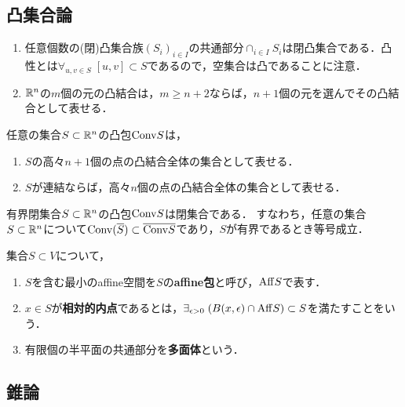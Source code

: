 \documentclass[uplatex,dvipdfmx]{jsreport}
\begin{document}
\subsection{凸集合論}



\begin{lemma}\mbox{}
    \begin{enumerate}
        \item 任意個数の(閉)凸集合族$(S_i)_{i\in I}$の共通部分$\cap_{i\in I}S_i$は閉凸集合である．凸性とは$\forall_{u,v\in S}\;[u,v]\subset S$であるので，空集合は凸であることに注意．
        \item $\mathbb{R}^n$の$m$個の元の凸結合は，$m\ge n+2$ならば，$n+1$個の元を選んでその凸結合として表せる．
    \end{enumerate}
\end{lemma}

\begin{theorem}[Caratheodory]
    任意の集合$S\subset\mathbb{R}^n$の凸包$\mathrm{Conv} S$は，
    \begin{enumerate}
        \item $S$の高々$n+1$個の点の凸結合全体の集合として表せる．
        \item $S$が連結ならば，高々$n$個の点の凸結合全体の集合として表せる．
    \end{enumerate}
\end{theorem}

\begin{theorem}
    有界閉集合$S\subset\mathbb{R}^n$の凸包$\mathrm{Conv} S$は閉集合である．
    すなわち，任意の集合$S\subset\mathbb{R}^n$について$\mathrm{Conv}(\overline{S})\subset\overline{\mathrm{Conv} S}$であり，$S$が有界であるとき等号成立．
\end{theorem}

\begin{definition}
    集合$S\subset V$について，
    \begin{enumerate}
        \item $S$を含む最小のaffine空間を$S$の\textbf{affine包}と呼び，$\mathrm{Aff} S$で表す．
        \item $x\in S$が\textbf{相対的内点}であるとは，$\exists_{\epsilon>0}\;(B(x,\epsilon)\cap\mathrm{Aff} S)\subset S$を満たすことをいう．
        \item 有限個の半平面の共通部分を\textbf{多面体}という．
    \end{enumerate}
\end{definition}

\subsection{錐論}
\end{document}
